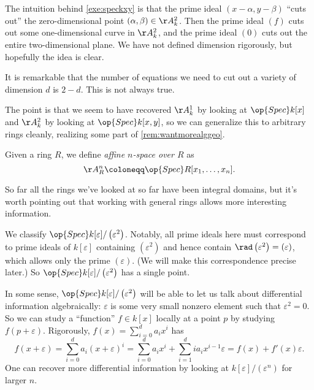 \documentclass[../notes.tex]{subfiles}
\begin{document}
\begin{remark}
	The intuition behind \autoref{exe:speckxy} is that the prime ideal $(x-\alpha,y-\beta)$ ``cuts out'' the zero-dimensional point $(\alpha,\beta)\in\AA^2_k$. Then the prime ideal $(f)$ cuts out some one-dimensional curve in $\AA^2_k$, and the prime ideal $(0)$ cuts out the entire two-dimensional plane. We have not defined dimension rigorously, but hopefully the idea is clear.
\end{remark}
\begin{remark}
	It is remarkable that the number of equations we need to cut out a variety of dimension $d$ is $2-d$. This is not always true.
\end{remark}
The point is that we seem to have recovered $\AA^1_k$ by looking at $\op{Spec}k[x]$ and $\AA^2_k$ by looking at $\op{Spec}k[x,y]$, so we can generalize this to arbitrary rings cleanly, realizing some part of \autoref{rem:wantmorealggeo}.
\begin{definition}
	Given a ring $R$, we define \textit{affine $n$-space over $R$} as
	\[\AA^n_R\coloneqq\op{Spec}R[x_1,\ldots,x_n].\]
\end{definition}
So far all the rings we've looked at so far have been integral domains, but it's worth pointing out that working with general rings allows more interesting information.
\begin{example}
	We classify $\op{Spec}k[\varepsilon]/\left(\varepsilon^2\right)$. Notably, all prime ideals here must correspond to prime ideals of $k[\varepsilon]$ containing $\left(\varepsilon^2\right)$ and hence contain $\rad\left(\varepsilon^2\right)=(\varepsilon)$, which allows only the prime $(\varepsilon)$. (We will make this correspondence precise later.) So $\op{Spec}k[\varepsilon]/\left(\varepsilon^2\right)$ has a single point.
\end{example}
\begin{remark}
	In some sense, $\op{Spec}k[\varepsilon]/\left(\varepsilon^2\right)$ will be able to let us talk about differential information algebraically: $\varepsilon$ is some very small nonzero element such that $\varepsilon^2=0$. So we can study a ``function'' $f\in k[x]$ locally at a point $p$ by studying $f(p+\varepsilon)$. Rigorously, $f(x)=\sum_{i=0}^da_ix^i$ has
	\[f(x+\varepsilon)=\sum_{i=0}^da_i(x+\varepsilon)^i=\sum_{i=0}^da_ix^i+\sum_{i=1}^dia_ix^{i-1}\varepsilon=f(x)+f'(x)\varepsilon.\]
	One can recover more differential information by looking at $k[\varepsilon]/\left(\varepsilon^n\right)$ for larger $n$.
\end{remark}
\end{document}
